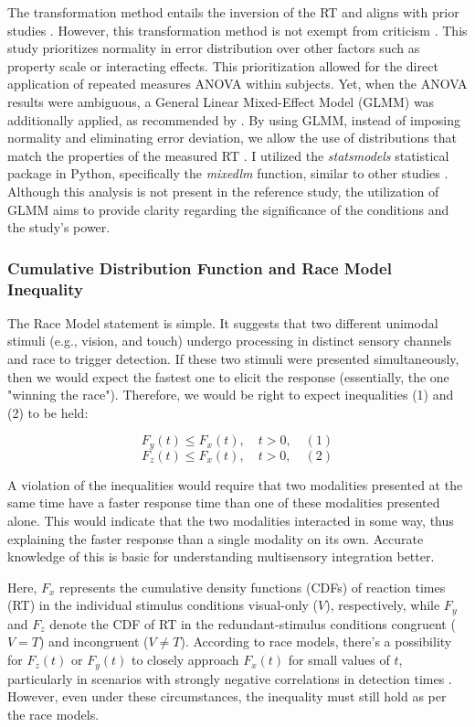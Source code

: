 \documentclass[12pt,oneside,openright]{report}
\begin{document}
The transformation method entails the inversion of the RT and aligns with prior studies \parencite{Innes2019ACA}. However, this transformation method is not exempt from criticism \parencite{Lo2015-fv}. This study prioritizes normality in error distribution over other factors such as property scale or interacting effects. This prioritization allowed for the direct application of repeated measures ANOVA within subjects. Yet, when the ANOVA results were ambiguous, a General Linear Mixed-Effect Model (GLMM) was additionally applied, as recommended by \textcite{Lo2015-fv}. By using GLMM, instead of imposing normality and eliminating error deviation, we allow the use of distributions that match the properties of the measured RT \parencite{Lo2015-fv}. I utilized the \textit{statsmodels} statistical package in Python, specifically the \textit{mixedlm} function, similar to other studies \parencite{RSE_FBI}. Although this analysis is not present in the reference study, the utilization of GLMM aims to provide clarity regarding the significance of the conditions and the study's power.

\subsubsection*{Cumulative Distribution Function and Race Model Inequality}

The Race Model statement is simple. It suggests that two different unimodal stimuli (e.g., vision, and touch) undergo processing in distinct sensory channels and race to trigger detection. If these two stimuli were presented simultaneously, then we would expect the fastest one to elicit the response (essentially, the one "winning the race"). Therefore, we would be right to expect inequalities (1) and (2) to be held:

\[
F_y(t) \leq F_x(t), \quad t > 0, \quad (1)
\]
\[
F_z(t) \leq F_x(t), \quad t > 0, \quad (2)
\]

A violation of the inequalities would require that two modalities presented at the same time have a faster response time than one of these modalities presented alone. This would indicate that the two modalities interacted in some way, thus explaining the faster response than a single modality on its own. Accurate knowledge of this is basic for understanding multisensory integration better.

Here, $F_x$ represents the cumulative density functions (CDFs) of reaction times (RT) in the individual stimulus conditions visual-only ($V$), respectively, while $F_y$ and $F_z$ denote the CDF of RT in the redundant-stimulus conditions congruent ($V=T$) and incongruent ($V \neq T$). According to race models, there's a possibility for $F_z(t)$ or $F_y(t)$ to closely approach $F_x(t)$ for small values of $t$, particularly in scenarios with strongly negative correlations in detection times \parencite{Ulrich2007}. However, even under these circumstances, the inequality must still hold as per the race models.
\end{document}
